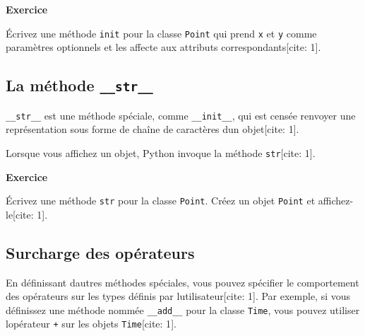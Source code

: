 \textbf{Exercice}

Écrivez une méthode \texttt{init} pour la classe \texttt{Point} qui
prend \texttt{x} et \texttt{y} comme paramètres optionnels et les
affecte aux attributs correspondants{[}cite: 1{]}.

\hypertarget{la-muxe9thode-__str__}{%
\subsection{\texorpdfstring{La méthode
\texttt{\_\_str\_\_}}{La méthode \_\_str\_\_}}\label{la-muxe9thode-__str__}}

\texttt{\_\_str\_\_} est une méthode spéciale, comme
\texttt{\_\_init\_\_}, qui est censée renvoyer une représentation sous
forme de chaîne de caractères d\textquotesingle un objet{[}cite: 1{]}.

\begin{Shaded}
\begin{Highlighting}[]

 \NormalTok{(}\NormalTok{):}
     \StringTok{\textquotesingle{}}\StringTok{:}\StringTok{:}\StringTok{\textquotesingle{}} \OperatorTok{\%}\NormalTok{ (}
\end{Highlighting}
\end{Shaded}

Lorsque vous affichez un objet, Python invoque la méthode
\texttt{str}{[}cite: 1{]}.

\textbf{Exercice}

Écrivez une méthode \texttt{str} pour la classe \texttt{Point}. Créez un
objet \texttt{Point} et affichez-le{[}cite: 1{]}.

\hypertarget{surcharge-des-opuxe9rateurs}{%
\subsection{Surcharge des
opérateurs}\label{surcharge-des-opuxe9rateurs}}

En définissant d\textquotesingle autres méthodes spéciales, vous pouvez
spécifier le comportement des opérateurs sur les types définis par
l\textquotesingle utilisateur{[}cite: 1{]}. Par exemple, si vous
définissez une méthode nommée \texttt{\_\_add\_\_} pour la classe
\texttt{Time}, vous pouvez utiliser l\textquotesingle opérateur
\texttt{+} sur les objets \texttt{Time}{[}cite: 1{]}.

